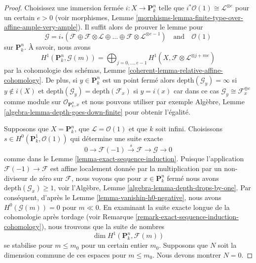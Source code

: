 \begin{proof}
Choisissez une immersion fermée $i : X \to
\mathbf{P}^n_k$ telle que $i^*\mathcal{O}(1) \cong
\mathcal{L}^{\otimes e}$ pour un certain $e > 0$ (voir
morphismes, Lemme
\ref{morphisms-lemma-finite-type-over-affine-ample-very-ample}). Il suffit alors de prouver le lemme pour
$$
\mathcal{G} =
i_*(\mathcal{F} \oplus \mathcal{F} \otimes \mathcal{L} \oplus \ldots
\oplus \mathcal{F} \otimes \mathcal{L}^{\otimes e - 1})
\quad\text{and}\quad \mathcal{O}(1)
$$
sur $\mathbf{P}^n_k$. À savoir, nous avons
$$
H^1(\mathbf{P}^n_k, \mathcal{G}(m)) =
\bigoplus\nolimits_{j = 0, \ldots, e - 1}
H^1(X, \mathcal{F} \otimes \mathcal{L}^{\otimes j + me})
$$
par la cohomologie des schémas, Lemme
\ref{coherent-lemma-relative-affine-cohomology}. De
plus, si $y \in \mathbf{P}^n_k$ est un point fermé
alors $\text{depth}(\mathcal{G}_y) = \infty$ si $y
\not \in i(X)$ et $\text{depth}(\mathcal{G}_y) =
\text{depth}(\mathcal{F}_x)$ si $y = i(x)$ car dans ce
cas $\mathcal{G}_y \cong \mathcal{F}_x^{\oplus e}$
comme module sur $\mathcal{O}_{\mathbf{P}^n_k, x}$ et
nous pouvons utiliser par exemple Algèbre, Lemme
\ref{algebra-lemma-depth-goes-down-finite} pour obtenir l'égalité.

\medskip\noindent
Supposons que $X = \mathbf{P}^n_k$, que $\mathcal{L} =
\mathcal{O}(1)$ et que $k$ soit infini. Choisissons $s \in
H^0(\mathbf{P}^1_k, \mathcal{O}(1))$ qui détermine une suite exacte
$$
0 \to \mathcal{F}(-1) \xrightarrow{s} \mathcal{F} \to \mathcal{G} \to 0
$$
comme dans le Lemme \ref{lemma-exact-sequence-induction}.
Puisque l'application $\mathcal{F}(-1) \to \mathcal{F}$ est
affine localement donnée par la multiplication par un
non-diviseur de zéro sur $\mathcal{F}$, nous voyons que pour
$x \in \mathbf{P}^n_k$ fermé nous avons
$\text{depth}(\mathcal{G}_x) \geq 1$, voir l'Algèbre, Lemme
\ref{algebra-lemma-depth-drops-by-one}. Par conséquent, d'après le
Lemme \ref{lemma-vanishin-h0-negative}, nous avons
$H^0(\mathcal{G}(m)) = 0$ pour $m \ll 0$. En examinant la suite exacte
longue de la cohomologie après tordage (voir Remarque
\ref{remark-exact-sequence-induction-cohomology}), nous trouvons que la suite de nombres
$$
\dim H^1(\mathbf{P}^n_k, \mathcal{F}(m))
$$
se stabilise pour $m \leq m_0$ pour un certain entier
$m_0$. Supposons que $N$ soit la dimension commune de ces
espaces pour $m \leq m_0$. Nous devons montrer $N = 0$.


\end{proof}
